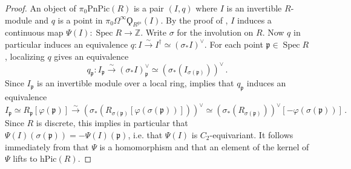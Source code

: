 \documentclass{article}
\DeclareMathOperator{\Spec}{Spec}
\renewcommand{\phi}{\varphi}
\newcommand{\ZZ}{\mathbb{Z}}
\newcommand{\pnpic}{\ensuremath{\mathrm{PnPic}}}
\theoremstyle{definition}
\begin{document}
\begin{proof} 
    An object of $ \pi_0 \pnpic(R) $ is a pair $ (I, q) $ where $ I $ is an invertible $ R$-module and $ q $ is a point in $ \pi_0 \Omega^\infty \Qoppa_{R^{gs}}(I) $. 
    By the proof of \cite[Theorem 3.5]{MR1966659}, $ I $ induces a continuous map $ \Psi(I) \colon \Spec R \to \ZZ $. 
    Write $ \sigma $ for the involution on $ R $. 
    Now $ q $ in particular induces an equivalence $ q \colon I \xrightarrow{\sim} I^\dag \simeq (\sigma_*I)^\vee $. 
    For each point $ \mathfrak{p} \in \Spec R $, localizing $ q $ gives an equivalence
    \begin{equation*}
        q_{\mathfrak{p}} \colon I_{\mathfrak{p}} \xrightarrow{\sim} (\sigma_*I)^\vee_{\mathfrak{p}} \simeq \left(\sigma_*(I_{\sigma(\mathfrak{p})})\right)^\vee \,.
    \end{equation*}
    Since $ I_{\mathfrak{p}} $ is an invertible module over a local ring, \cite[Proposition 3.2]{MR1966659} implies that $ q_{\mathfrak{p}} $ induces an equivalence
    \begin{equation*}
        I_{\mathfrak{p}} \simeq R_{\mathfrak{p}}[\phi(\mathfrak{p})] \xrightarrow{\sim} \left(\sigma_*(R_{\sigma(\mathfrak{p})}[\phi(\sigma(\mathfrak{p}))])\right)^\vee \simeq (\sigma_*(R_{\sigma(\mathfrak{p})}))^\vee [-\phi(\sigma(\mathfrak{p}))] \,.
    \end{equation*}
    Since $ R $ is discrete, this implies in particular that $ \Psi(I)(\sigma(\mathfrak{p})) = -\Psi(I)(\mathfrak{p}) $, i.e. that $ \Psi(I) $ is $ C_2 $-equivariant. 
    It follows immediately from \cite[Theorem 3.5]{MR1966659} that $ \Psi $ is a homomorphism and that an element of the kernel of $ \Psi $ lifts to $ \mathrm{hPic}(R) $. 


\end{proof}
\end{document}
